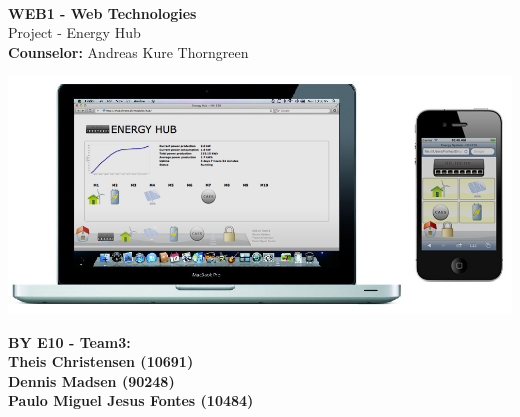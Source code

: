 
\begin{centering}
\thispagestyle{empty} %
\begin{center}
\vspace{5cm}
\textbf{\Huge {\\ \vspace{1cm}WEB1 - Web Technologies}}\\
\huge {Project - Energy Hub}\\ \vspace{0.5cm}
\large{\textbf{Counselor:} Andreas Kure Thorngreen}\\ \vspace{1.5cm}
\end{center}

\centering
\includegraphics[width=1.0\textwidth]{images/frontpage.png}
 \end{centering}
\vspace{1.5cm}
\begin{center}
\Large{\textbf{BY E10 - Team3: \\ \vspace{0.3cm}Theis Christensen (10691)\\ \vspace{0.7cm}Dennis Madsen (90248)\\  \vspace{0.7cm}Paulo Miguel Jesus Fontes (10484)}}
\end{center}